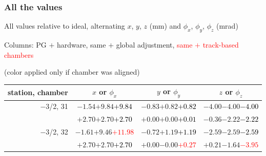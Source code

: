 \documentclass[compress]{beamer}
\begin{document}
\begin{frame}
\frametitle{All the values}
\tiny

All values relative to ideal, alternating $x$, $y$, $z$ (mm) and $\phi_x$, $\phi_y$, $\phi_z$ (mrad)

Columns: PG $+$ hardware, same $+$ global adjustment, \textcolor{red}{same $+$ track-based chambers}

\hfill (color applied only if chamber was aligned)

\vfill
\renewcommand{\arraystretch}{1.1}
\begin{tabular}{r | c | c | c}
station, chamber & $x$ or $\phi_x$ & $y$ or $\phi_y$ & $z$ or $\phi_z$ \\\hline
$-$3/2, 31 & $-1.54$\hspace{0.1 cm}$+9.84$\hspace{0.1 cm}\textcolor{black}{$+9.84$} & $-0.83$\hspace{0.1 cm}$+0.82$\hspace{0.1 cm}\textcolor{black}{$+0.82$} & $-4.00$\hspace{0.1 cm}$-4.00$\hspace{0.1 cm}\textcolor{black}{$-4.00$} \\
           & $+2.70$\hspace{0.1 cm}$+2.70$\hspace{0.1 cm}\textcolor{black}{$+2.70$} & $+0.00$\hspace{0.1 cm}$+0.00$\hspace{0.1 cm}\textcolor{black}{$+0.01$} & $-0.36$\hspace{0.1 cm}$-2.22$\hspace{0.1 cm}\textcolor{black}{$-2.22$} \\
$-$3/2, 32 & $-1.61$\hspace{0.1 cm}$+9.46$\hspace{0.1 cm}\textcolor{red}{$+11.98$} & $-0.72$\hspace{0.1 cm}$+1.19$\hspace{0.1 cm}\textcolor{black}{$+1.19$} & $-2.59$\hspace{0.1 cm}$-2.59$\hspace{0.1 cm}\textcolor{black}{$-2.59$} \\
           & $+2.70$\hspace{0.1 cm}$+2.70$\hspace{0.1 cm}\textcolor{black}{$+2.70$} & $+0.00$\hspace{0.1 cm}$-0.00$\hspace{0.1 cm}\textcolor{red}{$+0.27$} & $+0.21$\hspace{0.1 cm}$-1.64$\hspace{0.1 cm}\textcolor{red}{$-3.95$} \\

\end{tabular}
\end{frame}
\end{document}
